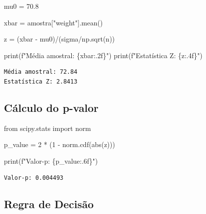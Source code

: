\documentclass[
  letterpaper,
  DIV=11,
  numbers=noendperiod]{scrreprt}
\newenvironment{Shaded}{\begin{snugshade}}{\end{snugshade}}
\newcommand{\BuiltInTok}[1]{\textcolor[rgb]{0.00,0.23,0.31}{#1}}
\newcommand{\DecValTok}[1]{\textcolor[rgb]{0.68,0.00,0.00}{#1}}
\newcommand{\FloatTok}[1]{\textcolor[rgb]{0.68,0.00,0.00}{#1}}
\newcommand{\ImportTok}[1]{\textcolor[rgb]{0.00,0.46,0.62}{#1}}
\newcommand{\NormalTok}[1]{\textcolor[rgb]{0.00,0.23,0.31}{#1}}
\newcommand{\OperatorTok}[1]{\textcolor[rgb]{0.37,0.37,0.37}{#1}}
\newcommand{\SpecialCharTok}[1]{\textcolor[rgb]{0.37,0.37,0.37}{#1}}
\newcommand{\SpecialStringTok}[1]{\textcolor[rgb]{0.13,0.47,0.30}{#1}}
\newcommand{\StringTok}[1]{\textcolor[rgb]{0.13,0.47,0.30}{#1}}
\begin{document}
\begin{Shaded}
\begin{Highlighting}[]
\NormalTok{mu0 }\OperatorTok{=} \FloatTok{70.8} 

\NormalTok{xbar }\OperatorTok{=}\NormalTok{ amostra[}\StringTok{"weight"}\NormalTok{].mean() }

\NormalTok{z }\OperatorTok{=}\NormalTok{ (xbar }\OperatorTok{{-}}\NormalTok{ mu0)}\OperatorTok{/}\NormalTok{(sigma}\OperatorTok{/}\NormalTok{np.sqrt(n)) }

\BuiltInTok{print}\NormalTok{(}\SpecialStringTok{f"Média amostral: }\SpecialCharTok{\{}\NormalTok{xbar}\SpecialCharTok{:.2f\}}\SpecialStringTok{"}\NormalTok{) }
\BuiltInTok{print}\NormalTok{(}\SpecialStringTok{f"Estatística Z: }\SpecialCharTok{\{}\NormalTok{z}\SpecialCharTok{:.4f\}}\SpecialStringTok{"}\NormalTok{)}
\end{Highlighting}
\end{Shaded}

\begin{verbatim}
Média amostral: 72.84
Estatística Z: 2.8413
\end{verbatim}

\subsection{Cálculo do p-valor}\label{cuxe1lculo-do-p-valor}

\begin{Shaded}
\begin{Highlighting}[]
\ImportTok{from}\NormalTok{ scipy.stats }\ImportTok{import}\NormalTok{ norm}

\NormalTok{p\_value }\OperatorTok{=} \DecValTok{2} \OperatorTok{*}\NormalTok{ (}\DecValTok{1} \OperatorTok{{-}}\NormalTok{ norm.cdf(}\BuiltInTok{abs}\NormalTok{(z)))}

\BuiltInTok{print}\NormalTok{(}\SpecialStringTok{f"Valor{-}p: }\SpecialCharTok{\{}\NormalTok{p\_value}\SpecialCharTok{:.6f\}}\SpecialStringTok{"}\NormalTok{)}
\end{Highlighting}
\end{Shaded}

\begin{verbatim}
Valor-p: 0.004493
\end{verbatim}

\subsection{Regra de Decisão}\label{regra-de-decisuxe3o-1}
\end{document}
